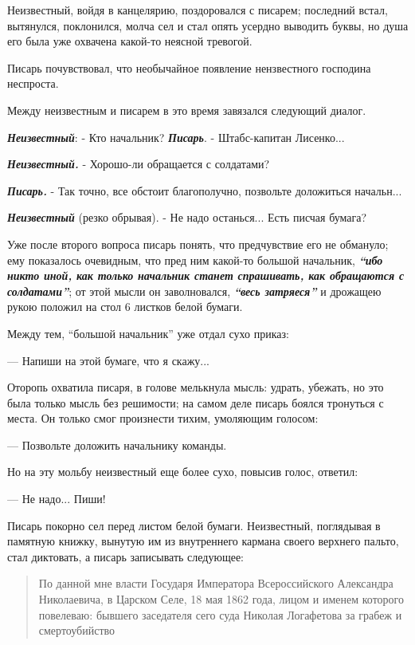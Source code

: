 \documentclass[a4paper,20pt]{report}
\begin{document}
Неизвестный, войдя в канцелярию, поздоровался с писарем; последний встал,
вытянулся, поклонился, молча сел и стал опять усердно выводить буквы, но душа
его была уже охвачена какой-то неясной тревогой.

Писарь почувствовал, что необычайное появление нензвестного господина
неспроста. 

Между неизвестным и писарем в это время завязался следующий диалог.

\textbf{\em Неизвестный}: - Кто начальник?
\textbf{\em Писарь}. - Штабс-капитан Лисенко...

\textbf{\em Неизвестный.} - Хорошо-ли обращается с солдатами?

\textbf{\em Писарь.} - Так точно, все обстоит благополучно, позвольте доложиться начальн...

\textbf{\em Неизвестный} (резко обрывая). - Не надо останься...  Есть писчая бумага?

Уже после второго вопроса писарь понять, что предчувствие его не обмануло; 
ему показалось очевидным, что пред ним какой-то большой начальник, \textbf{\em ``ибо никто иной,
как только начальник станет спрашивать, как обращаются с солдатами''}; от этой мысли он заволновался,
\textbf{\em ``весь затряеся''} и дрожащею рукою положил на стол 6 листков белой бумаги.

Между тем, ``большой начальник'' уже отдал сухо приказ:

— Напиши на этой бумаге, что я скажу...

Оторопь охватила писаря, в голове мелькнула мысль: удрать, убежать, но это была
только мысль без решимости; на самом деле писарь боялся тронуться с места. Он
только смог произнести тихим, умоляющим голосом:

— Позвольте доложить начальнику команды.

Но на эту мольбу неизвестный еще более сухо, повысив голос, ответил:

— Не надо... Пиши!

Писарь покорно сел перед листом белой бумаги.  Неизвестный, поглядывая в
памятную книжку, вынутую им из внутреннего кармана своего верхнего пальто, стал
диктовать, а писарь записывать следующее:

\begin{quote}
\em\bfseries

По данной мне власти Государя Императора Всероссийского Александра Николаевича,
в Царском Селе, 18 мая 1862 года, лицом и именем которого повелеваю:
бывшего заседателя сего суда Николая Логафетова за грабеж и
смертоубийство
\end{quote}
\end{document}

